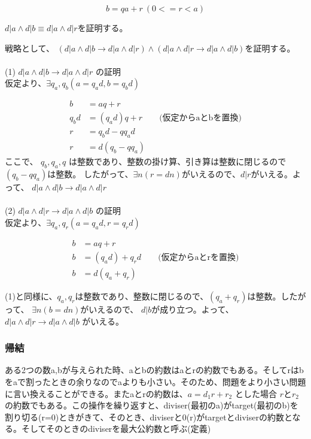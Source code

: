 \documentclass[dvipdfmx]{jsarticle}
\begin{document}
\[ b = qa + r \ (0 <= r < a)\]

$d | a \land d | b \equiv d | a \land d | r $を証明する。

戦略として、 $(d | a \land d | b \rightarrow d | a \land d | r) \land (d | a \land d | r \rightarrow  d | a \land d | b) $を証明する。
\\\\
(1) $d | a \land d | b \rightarrow d | a \land d | r$ の証明 \\
仮定より、$\exists q_a, q_b ( a = q_ad, b = q_bd)$

\begin{align*}
  b &= aq + r \\
  q_bd &= (q_ad)q + r \qquad \text{(仮定からaとbを置換)} \\
  r &= q_bd - qq_ad \\
  r &= d(q_b - qq_a)
\end{align*}
ここで、 $q_b, q_a, q$ は整数であり、整数の掛け算、引き算は整数に閉じるので$(q_b - qq_a)$は整数。
  したがって、$\exists n ( r = dn) がいえるので、 d | r$がいえる。よって、
  $d | a \land d | b \rightarrow d | a \land d | r$
\\\\
(2) $d | a \land d | r \rightarrow d | a \land d | b$ の証明 \\
仮定より、$\exists q_a, q_r ( a = q_ad, r = q_rd)$

\begin{align*}
  b &= aq + r \\
  b &= (q_ad) + q_rd \qquad \text{(仮定からaとrを置換)} \\
  b &= d(q_a + q_r)
\end{align*}

(1)と同様に、$q_a, q_r$は整数であり、整数に閉じるので、$(q_a + q_r)$は整数。したがって、 $\exists n ( b = dn)$がいえるので、 $d | b$が成り立つ。よって、 $d | a \land d | r \rightarrow d | a \land d | b$ がいえる。

\subsubsection{帰結}
ある2つの数a,bが与えられた時、aとbの約数はaとrの約数でもある。そしてrはbをaで割ったときの余りなのでaよりも小さい。そのため、問題をより小さい問題に言い換えることができる。またaとrの約数は、$a = d_1r + r_2$ とした場合 $rとr_2$の約数でもある。この操作を繰り返すと、diviser(最初のa)がtarget(最初のb)を割り切る(r=0)ときがきて、そのとき、diviserと0(r)がtargetとdiviserの約数となる。そしてそのときのdiviserを最大公約数と呼ぶ(定義)
\end{document}
